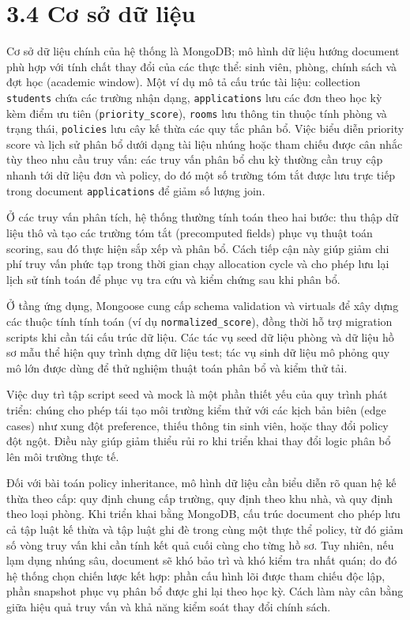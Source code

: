 \section*{3.4 Cơ sở dữ liệu}
Cơ sở dữ liệu chính của hệ thống là MongoDB; mô hình dữ liệu hướng document phù hợp với tính chất thay đổi của các thực thể: sinh viên, phòng, chính sách và đợt học (academic window). Một ví dụ mô tả cấu trúc tài liệu: collection \texttt{students} chứa các trường nhận dạng, \texttt{applications} lưu các đơn theo học kỳ kèm điểm ưu tiên (\texttt{priority\_score}), \texttt{rooms} lưu thông tin thuộc tính phòng và trạng thái, \texttt{policies} lưu cây kế thừa các quy tắc phân bổ. Việc biểu diễn priority score và lịch sử phân bổ dưới dạng tài liệu nhúng hoặc tham chiếu được cân nhắc tùy theo nhu cầu truy vấn: các truy vấn phân bổ chu kỳ thường cần truy cập nhanh tới dữ liệu đơn và policy, do đó một số trường tóm tắt được lưu trực tiếp trong document \texttt{applications} để giảm số lượng join.

Ở các truy vấn phân tích, hệ thống thường tính toán theo hai bước: thu thập dữ liệu thô và tạo các trường tóm tắt (precomputed fields) phục vụ thuật toán scoring, sau đó thực hiện sắp xếp và phân bổ. Cách tiếp cận này giúp giảm chi phí truy vấn phức tạp trong thời gian chạy allocation cycle và cho phép lưu lại lịch sử tính toán để phục vụ tra cứu và kiểm chứng sau khi phân bổ.

Ở tầng ứng dụng, Mongoose cung cấp schema validation và virtuals để xây dựng các thuộc tính tính toán (ví dụ \texttt{normalized\_score}), đồng thời hỗ trợ migration scripts khi cần tái cấu trúc dữ liệu. Các tác vụ seed dữ liệu phòng và dữ liệu hồ sơ mẫu thể hiện quy trình dựng dữ liệu test; tác vụ sinh dữ liệu mô phỏng quy mô lớn được dùng để thử nghiệm thuật toán phân bổ và kiểm thử tải.

Việc duy trì tập script seed và mock là một phần thiết yếu của quy trình phát triển: chúng cho phép tái tạo môi trường kiểm thử với các kịch bản biên (edge cases) như xung đột preference, thiếu thông tin sinh viên, hoặc thay đổi policy đột ngột. Điều này giúp giảm thiểu rủi ro khi triển khai thay đổi logic phân bổ lên môi trường thực tế.

Đối với bài toán policy inheritance, mô hình dữ liệu cần biểu diễn rõ quan hệ kế thừa theo cấp: quy định chung cấp trường, quy định theo khu nhà, và quy định theo loại phòng. Khi triển khai bằng MongoDB, cấu trúc document cho phép lưu cả tập luật kế thừa và tập luật ghi đè trong cùng một thực thể policy, từ đó giảm số vòng truy vấn khi cần tính kết quả cuối cùng cho từng hồ sơ. Tuy nhiên, nếu lạm dụng nhúng sâu, document sẽ khó bảo trì và khó kiểm tra nhất quán; do đó hệ thống chọn chiến lược kết hợp: phần cấu hình lõi được tham chiếu độc lập, phần snapshot phục vụ phân bổ được ghi lại theo học kỳ. Cách làm này cân bằng giữa hiệu quả truy vấn và khả năng kiểm soát thay đổi chính sách.

